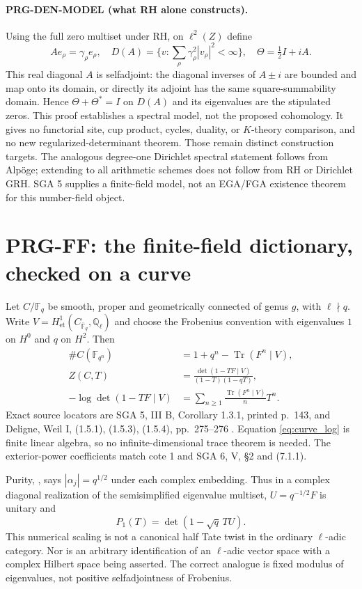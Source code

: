 \documentclass[11pt,a4paper]{article}
\newcommand{\Tr}{\operatorname{Tr}}
\newcommand{\Q}{\mathbb Q}
\newcommand{\F}{\mathbb F}
\begin{document}
\paragraph{PRG-DEN-MODEL (what RH alone constructs).}
Using the full zero multiset under RH, on $\ell^2(Z)$ define
\[
 Ae_\rho=\gamma_\rho e_\rho,\quad
 D(A)=\{v:\sum_\rho\gamma_\rho^2|v_\rho|^2<\infty\},\quad
 \Theta=\tfrac12I+iA.
\]
This real diagonal $A$ is selfadjoint: the diagonal inverses of $A\pm i$ are bounded and map onto its domain, or directly its adjoint has the same square-summability domain. Hence $\Theta+\Theta^*=I$ on $D(A)$ and its eigenvalues are the stipulated zeros. This proof establishes a spectral model, not the proposed cohomology. It gives no functorial site, cup product, cycles, duality, or $K$-theory comparison, and no new regularized-determinant theorem. Those remain distinct construction targets. The analogous degree-one Dirichlet spectral statement follows from Alp\"oge; extending to all arithmetic schemes does not follow from RH or Dirichlet GRH. SGA 5 supplies a finite-field model, not an EGA/FGA existence theorem for this number-field object.

\section{PRG-FF: the finite-field dictionary, checked on a curve}
Let $C/\F_q$ be smooth, proper and geometrically connected of genus $g$, with $\ell\nmid q$. Write $V=H^1_{\mathrm{et}}(C_{\overline{\F}_q},\Q_\ell)$ and choose the Frobenius convention with eigenvalues $1$ on $H^0$ and $q$ on $H^2$. Then
\begin{align}
 \#C(\F_{q^n})&=1+q^n-\Tr(F^n\mid V),\label{eq:curve_trace}\\
 Z(C,T)&=\frac{\det(1-TF\mid V)}{(1-T)(1-qT)},\label{eq:curve_det}\\
 -\log\det(1-TF\mid V)&=\sum_{n\ge1}\frac{\Tr(F^n\mid V)}{n}T^n.\label{eq:curve_log}
\end{align}
Exact source locators are SGA 5, III B, Corollary 1.3.1, printed p.~143, and Deligne, Weil I, (1.5.1), (1.5.3), (1.5.4), pp.~275--276 \cite{sga5,weil1}. Equation \eqref{eq:curve_log} is finite linear algebra, so no infinite-dimensional trace theorem is needed. The exterior-power coefficients match cote 1 and SGA 6, V, \S2 and (7.1.1).

Purity, \cite[Theorem (1.6)]{weil1}, says $|\alpha_j|=q^{1/2}$ under each complex embedding. Thus in a complex diagonal realization of the semisimplified eigenvalue multiset, $U=q^{-1/2}F$ is unitary and
\[
 P_1(T)=\det(1-\sqrt q\,T U).
\]
This numerical scaling is not a canonical half Tate twist in the ordinary $\ell$-adic category. Nor is an arbitrary identification of an $\ell$-adic vector space with a complex Hilbert space being asserted. The correct analogue is fixed modulus of eigenvalues, not positive selfadjointness of Frobenius.
\end{document}
